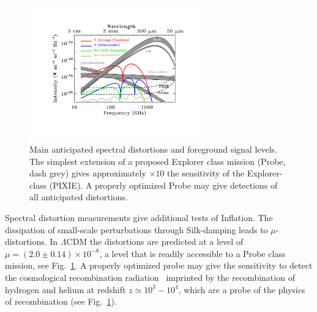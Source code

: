 \begin{figure}[ht!]
\hspace{-0.2in}
\parbox{4.0in}{\centerline {
\includegraphics[width=3.0in]{Figures/probe_spectral_foregrounds_v3.pdf} } }
\hspace{-0.05in}
\parbox{2.5in}{
\caption{ \small \setlength{\baselineskip}{0.95\baselineskip}
Main anticipated spectral distortions and foreground signal levels. The simplest extension of a proposed
Explorer class mission (Probe, dash grey) gives approximately $\times10$ the sensitivity of the Explorer-class (PIXIE). 
A properly optimized Probe may give detections of all anticipated distortions.  
\label{fig:distortions} } }
\vspace{-0.1in}
\end{figure}

Spectral distortion measurements give additional tests of Inflation. The dissipation of small-scale 
perturbations through Silk-damping \cite{Sunyaev1970diss, Daly1991, Hu1994, Chluba2012} leads to $\mu$-distortions. 
In $\Lambda$CDM the distortions are predicted at a level of $\mu=(2.0\pm0.14)\times 10^{-8}$, a level that 
is readily accessible to a Probe class mission, see Fig.~\ref{fig:distortions}\cite{Chluba2012, Chluba2016LCDM}. 
A properly optimized probe may give the sensitivity to detect the cosmological recombination 
radiation~\citep{Sunyaev2009, Chluba2016} imprinted by the recombination of hydrogen and helium 
at redshift $z\simeq 10^3-10^4$, which are a probe of the physics of recombination (see Fig.~\ref{fig:distortions}). 


